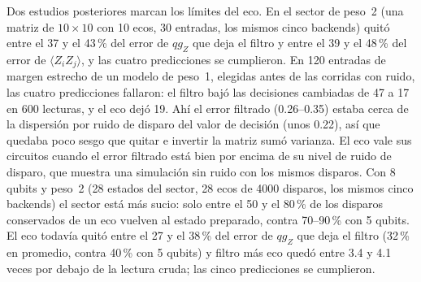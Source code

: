 \documentclass[11pt]{article}
\newcommand{\qZ}{qg_Z}
\begin{document}
Dos estudios posteriores marcan los límites del eco. En el sector de peso~2 (una matriz de $10\times10$ con 10 ecos,
30 entradas, los mismos cinco backends) quitó entre el 37 y el 43\,\% del error de $\qZ$ que deja el filtro y entre el 39
y el 48\,\% del error de $\langle Z_iZ_j\rangle$, y las cuatro predicciones se cumplieron. En 120 entradas de margen
estrecho de un modelo de peso~1, elegidas antes de las corridas con ruido, las cuatro predicciones fallaron: el filtro
bajó las decisiones cambiadas de 47 a 17 en 600 lecturas, y el eco dejó 19. Ahí el error filtrado (0.26--0.35) estaba
cerca de la dispersión por ruido de disparo del valor de decisión (unos 0.22), así que quedaba poco sesgo que quitar e
invertir la matriz sumó varianza. El eco vale sus circuitos cuando el error filtrado está bien por encima de su nivel de
ruido de disparo, que muestra una simulación sin ruido con los mismos disparos. Con 8 qubits y peso~2 (28 estados del
sector, 28 ecos de 4000 disparos, los mismos cinco backends) el sector está más sucio: solo entre el 50 y el 80\,\%
de los disparos conservados de un eco vuelven al estado preparado, contra 70--90\,\% con 5 qubits. El eco todavía
quitó entre el 27 y el 38\,\% del error de $\qZ$ que deja el filtro (32\,\% en promedio, contra 40\,\% con 5 qubits)
y filtro más eco quedó entre 3.4 y 4.1 veces por debajo de la lectura cruda; las cinco predicciones se cumplieron.
\end{document}
